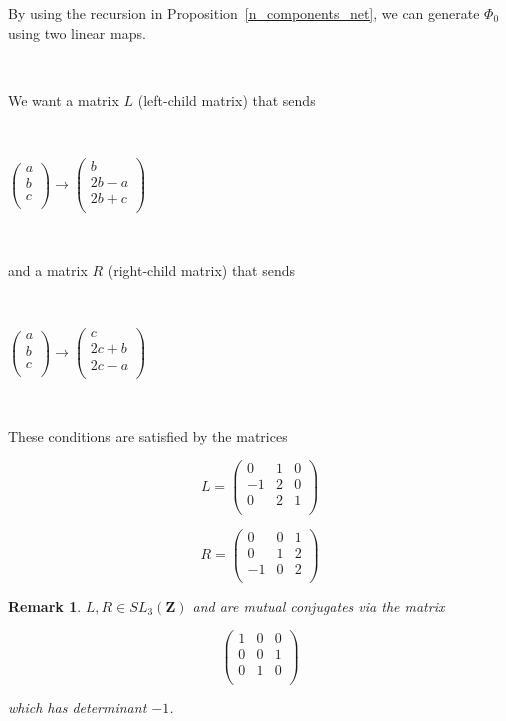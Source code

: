 \documentclass{article}
\newtheorem{remark}[theorem]{Remark}  %
\begin{document}
By using the recursion in Proposition~\ref{n_components_net}, we can generate $\Phi_0$ using two linear maps.

\

We want a matrix $L$ (left-child matrix) that sends

\

$\begin{pmatrix}
a \\
b \\
c \\
\end{pmatrix} \rightarrow \begin{pmatrix}
b \\
2b-a \\
2b+c \\
\end{pmatrix}$

\

and a matrix $R$ (right-child matrix) that sends

\

$\begin{pmatrix}
a \\
b \\
c \\
\end{pmatrix} \rightarrow \begin{pmatrix}
c \\
2c+b \\
2c-a \\
\end{pmatrix}$

\

These conditions are satisfied by the matrices

$$L = 
\begin{pmatrix}
0 & 1 & 0 \\
-1 & 2 & 0 \\
0 & 2 & 1 \\
\end{pmatrix}
$$

$$R = \begin{pmatrix}
0 & 0 & 1 \\
0 & 1 & 2 \\
-1 & 0 & 2 \\
\end{pmatrix}$$

\begin{remark}
$L, R \in SL_3(\mathbf{Z})$ and are  mutual conjugates via the matrix

$$\begin{pmatrix}
1 & 0 & 0 \\
0 & 0 & 1 \\
0 & 1 & 0 \\
\end{pmatrix}$$

which has determinant $-1$.
\end{remark}
\end{document}
